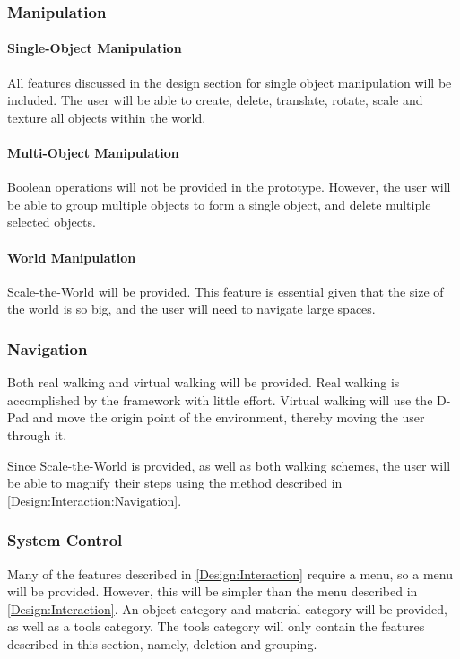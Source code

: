 \subsubsection{Manipulation}
\paragraph{Single-Object Manipulation}
All features discussed in the design section for single object manipulation will be included.
The user will be able to create, delete, translate, rotate, scale and texture all objects within the world.

\paragraph{Multi-Object Manipulation}
Boolean operations will not be provided in the prototype.
However, the user will be able to group multiple objects to form a single object, and delete multiple selected objects.

\paragraph{World Manipulation}
Scale-the-World will be provided.
This feature is essential given that the size of the world is so big, and the user will need to navigate large spaces.

\subsubsection{Navigation}
Both real walking and virtual walking will be provided.
Real walking is accomplished by the framework with little effort.
Virtual walking will use the D-Pad and move the origin point of the environment, thereby moving the user through it.

Since Scale-the-World is provided, as well as both walking schemes, the user will be able to magnify their steps using the method described in \ref{Design:Interaction:Navigation}.

\subsubsection{System Control}
Many of the features described in \ref{Design:Interaction} require a menu, so a menu will be provided.
However, this will be simpler than the menu described in \ref{Design:Interaction}.
An object category and material category will be provided, as well as a tools category.
The tools category will only contain the features described in this section, namely, deletion and grouping.

